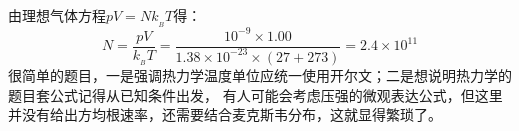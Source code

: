 %
    \chapter[热力学]{}
    \begin{solution}
        由理想气体方程$pV=Nk_{_B}T$得：
        \begin{equation*}
            N = \frac{pV}{k_{_B}T} = \frac{10^{-9}\times 1.00}{1.38\times 10^{-23}\times (27+273)} = 2.4 \times 10^{11}
        \end{equation*}
        很简单的题目，一是强调热力学温度单位应统一使用开尔文；二是想说明热力学的题目套公式记得从已知条件出发，
        有人可能会考虑压强的微观表达公式，但这里并没有给出方均根速率，还需要结合麦克斯韦分布，这就显得繁琐了。
    \end{solution}
